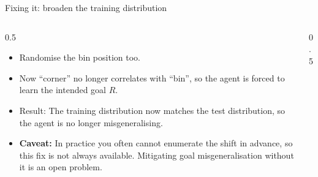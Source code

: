 
\begin{frame}[t]{Fixing it: broaden the training distribution}
\begin{columns}[T]
\begin{column}{0.5\textwidth}  
\begin{itemize}
\item Randomise the bin position too.
\item Now ``corner'' no longer correlates with ``bin'',
so the agent is forced to learn the intended goal $R$.
\item Result: The training distribution now matches the test distribution,
so the agent is no longer misgeneralising.
\item \textbf{Caveat:} In practice you often cannot enumerate the shift in advance,
so this fix is not always available. Mitigating goal misgeneralisation without it is an open problem.
\end{itemize}
\end{column}
\begin{column}{0.5\textwidth}
\centering
{}
\end{column}
\end{columns}
\end{frame}

